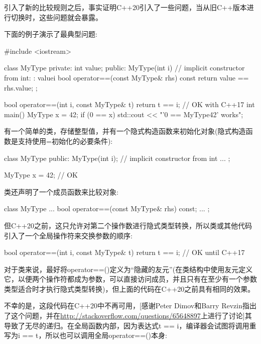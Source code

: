 
引入了新的比较规则之后，事实证明C++20引入了一些问题，当从旧C++版本进行切换时，这些问题就会暴露。


下面的例子演示了最典型问题:


\begin{cpp}
#include <iostream>

class MyType {
private:
	int value;
public:
	MyType(int i) // implicit constructor from int:
		: value{i} {
	}
	bool operator==(const MyType& rhs) const {
		return value == rhs.value;
	}
};

bool operator==(int i, const MyType& t) {
	return t == i; // OK with C++17
}
int main()
{
	MyType x = 42;
	if (0 == x) {
		std::cout << "'0 == MyType{42}' works\n";
	}
}
\end{cpp}

有一个简单的类，存储整型值，并有一个隐式构造函数来初始化对象(隐式构造函数是支持使用=初始化的必要条件):

\begin{cpp}
class MyType {
	public:
	MyType(int i); // implicit constructor from int
	...
};

MyType x = 42; // OK
\end{cpp}

类还声明了一个成员函数来比较对象:

\begin{cpp}
class MyType {
	...
	bool operator==(const MyType& rhs) const;
	...
};
\end{cpp}

但C++20之前，这只允许对第二个操作数进行隐式类型转换，所以类或其他代码引入了一个全局操作符来交换参数的顺序:

\begin{cpp}
bool operator==(int i, const MyType& t) {
	return t == i; // OK until C++17
}
\end{cpp}

对于类来说，最好将operator==()定义为“隐藏的友元”(在类结构中使用友元定义它，以便两个操作符都成为参数，可以直接访问成员，并且只有在至少有一个参数类型适合时才执行隐式类型转换)，但上面的代码在C++20之前具有相同的效果。

不幸的是，这段代码在C++20中不再可用，[感谢Peter Dimov和Barry Revzin指出了这个问题，并在\url{http://stackoverflow.com/questions/65648897}上进行了讨论]其导致了无尽的递归。在全局函数内部，因为表达式t == i，编译器会试图将调用重写为i == t，所以也可以调用全局operator==()本身:

